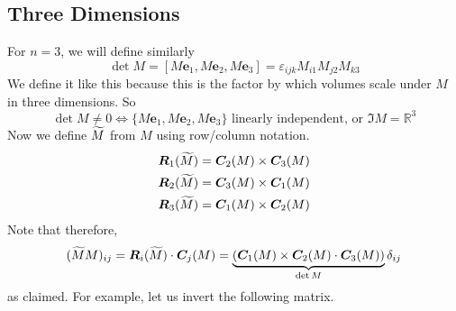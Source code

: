 \documentclass{article}
\begin{document}
\subsection{Three Dimensions}
For $n=3$, we will define similarly
\[ \det M = [M\bm e_1, M\bm e_2, M\bm e_3] = \varepsilon_{ijk}M_{i1}M_{j2}M_{k3} \]
We define it like this because this is the factor by which volumes scale under $M$ in three dimensions. So
\[ \det M \neq 0 \iff \{ M \bm e_1, M \bm e_2, M \bm e_3 \} \text{ linearly independent, or } \Im M = \mathbb R^3 \]
Now we define $\widetilde{M}$ from $M$ using row/column notation.
\begin{align*}
	\bm R_1(\widetilde{M}) & = \bm C_2(M) \times \bm C_3(M) \\
	\bm R_2(\widetilde{M}) & = \bm C_3(M) \times \bm C_1(M) \\
	\bm R_3(\widetilde{M}) & = \bm C_1(M) \times \bm C_2(M)
\end{align*}
Note that therefore,
\[ (\widetilde{M} M)_{ij} = \bm R_i(\widetilde{M}) \cdot \bm C_j(M) = \underbrace{(\bm C_1(M) \times \bm C_2(M) \cdot \bm C_3(M))}_{\det M}\delta_{ij} \]
as claimed. For example, let us invert the following matrix.
\end{document}
